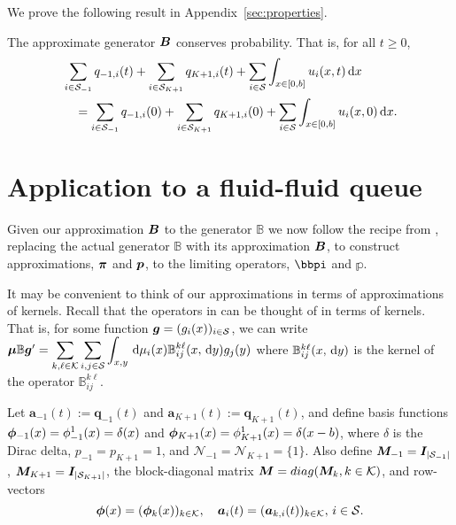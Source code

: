 
We prove the following result in Appendix~\ref{sec:properties}.
\begin{cor}
	The approximate generator \( \boldsymbol B\) conserves probability. That is, for all \(t\geq 0\),
	\begin{align*}
	\begin{multlined}[t]\sum_{i\in\calS_{-1}}q_{{-1},i}(t)+\sum_{i\in\calS_{K+1}}q_{{K+1},i}(t)+\sum_{i\in\calS} \int_{x\in[0,b]}u_i(x,t)\wrt x 
	\\= \sum_{i\in\calS_{-1}}q_{{-1},i}(0)+\sum_{i\in\calS_{K+1}}q_{{K+1},i}(0)+\sum_{i\in\calS} \int_{x\in[0,b]}u_i(x,0)\wrt x.\end{multlined}
	\end{align*}
\end{cor}


\section{Application to a fluid-fluid queue}\label{sec:DGSFFM}
Given our approximation \(\boldsymbol B\) to the generator \(\mathbb B\) we now follow the recipe from \cite{bo2014}, replacing the actual generator \(\mathbb B\) with its approximation \({  \boldsymbol B}\), to construct approximations, \(\boldsymbol \pi\) and \(\boldsymbol p\), to the limiting operators, \(\bbpi\) and \(\mathbb p\).

It may be convenient to think of our approximations in terms of approximations of kernels. Recall that the operators in \citep{bo2014} can be thought of in terms of kernels. That is, for some function \(\boldsymbol g = (g_i(x))_{i\in\mathcal{S}}\), we can write \(\boldsymbol \mu \mathbb B \boldsymbol g'{} = \displaystyle \sum\limits_{k,\ell\in\mathcal K}\sum\limits_{i,j\in\mathcal{S}} \displaystyle \int_{x,y}\, \mathrm{d} \mu_i(x) \mathbb B_{ij}^{k\ell}(x,\, \mathrm{d} y)g_j(y)\) where \(\mathbb B_{ij}^{k\ell}(x,\, \mathrm{d} y)\) is the kernel of the operator \(\mathbb B_{ij}^{k\ell}\). 

Let \(\boldsymbol a_{-1}(t):=\boldsymbol q_{-1}(t)\) and \(\boldsymbol a_{K+1}(t):=\boldsymbol q_{K+1}(t)\), and define basis functions \(\boldsymbol\phi_{-1}(x) = \phi_{-1}^1(x) = \delta(x)\) and \(\boldsymbol\phi_{K+1}(x) = \phi_{K+1}^1(x) = \delta(x-b)\), where \(\delta\) is the Dirac delta, \(p_{-1} = p_{K+1} = 1\), and \(\mathcal N_{-1} = \mathcal N_{K+1} = \{1\}\). Also define \({\boldsymbol M}_{-1}=\boldsymbol I_{|\mathcal{S}_{-1}|}\), \({\boldsymbol M}_{K+1}=\boldsymbol I_{|\mathcal{S}_{K+1}|}\), the block-diagonal matrix \(\boldsymbol M=diag(\boldsymbol M_k,k\in\mathcal K)\), and row-vectors 
\[\boldsymbol \phi(x) = (\boldsymbol\phi_k(x))_{k\in\mathcal K}, \quad \boldsymbol a_i(t) = (\boldsymbol a_{k,i}(t))_{k\in\mathcal K},\,i\in\mathcal{S}.\]

